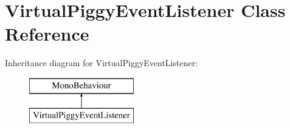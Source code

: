 \hypertarget{class_virtual_piggy_event_listener}{\section{Virtual\-Piggy\-Event\-Listener Class Reference}
\label{class_virtual_piggy_event_listener}
}
Inheritance diagram for Virtual\-Piggy\-Event\-Listener\-:\begin{figure}[H]
\begin{center}
\leavevmode
\includegraphics[height=2.000000cm]{class_virtual_piggy_event_listener}
\end{center}
\end{figure}

